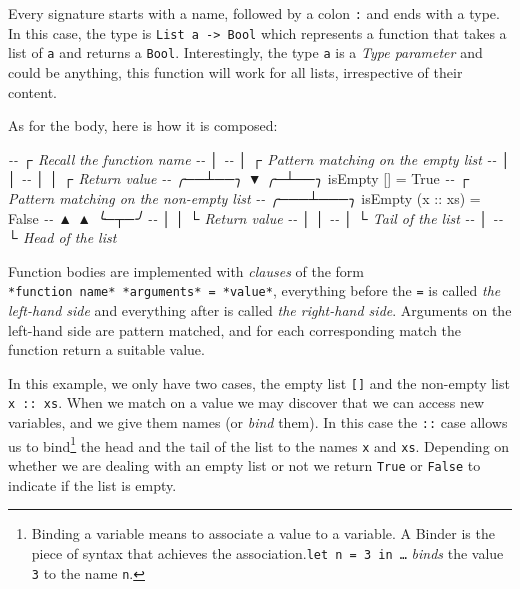 \documentclass[
]{article}
\newenvironment{Shaded}{}{}
\newcommand{\CommentTok}[1]{\textcolor[rgb]{0.38,0.63,0.69}{\textit{#1}}}
\newcommand{\DataTypeTok}[1]{\textcolor[rgb]{0.56,0.13,0.00}{#1}}
\newcommand{\NormalTok}[1]{#1}
\newcommand{\OtherTok}[1]{\textcolor[rgb]{0.00,0.44,0.13}{#1}}
\begin{document}
Every signature starts with a name, followed by a colon \texttt{:} and
ends with a type. In this case, the type is
\texttt{List\ a\ -\textgreater{}\ Bool} which represents a function that
takes a list of \texttt{a} and returns a \texttt{Bool}. Interestingly,
the type \texttt{a} is a \emph{Type parameter} and could be anything,
this function will work for all lists, irrespective of their content.

As for the body, here is how it is composed:

\begin{Shaded}
\begin{Highlighting}[]
\CommentTok{{-}{-}    ┌ Recall the function name}
\CommentTok{{-}{-}    │   }
\CommentTok{{-}{-}    │     ┌ Pattern matching on the empty list}
\CommentTok{{-}{-}    │     │   }
\CommentTok{{-}{-}    │     │    ┌ Return value}
\CommentTok{{-}{-} ╭──┴──╮  ▼  ╭─┴──╮}
\NormalTok{   isEmpty [] }\OtherTok{=} \DataTypeTok{True}
\CommentTok{{-}{-}             ┌ Pattern matching on the non{-}empty list}
\CommentTok{{-}{-}         ╭───┴───╮}
\NormalTok{   isEmpty (}\OtherTok{x ::}\NormalTok{ xs) }\OtherTok{=} \DataTypeTok{False}
\CommentTok{{-}{-}          ▲    ▲     ╰─┬─╯}
\CommentTok{{-}{-}          │    │       └ Return value}
\CommentTok{{-}{-}          │    │}
\CommentTok{{-}{-}          │    └ Tail of the list}
\CommentTok{{-}{-}          │}
\CommentTok{{-}{-}          └ Head of the list}
\end{Highlighting}
\end{Shaded}

Function bodies are implemented with \emph{clauses} of the form
\texttt{*function\ name*\ *arguments*\ =\ *value*}, everything before
the \texttt{=} is called \emph{the left-hand side} and everything after
is called \emph{the right-hand side}. Arguments on the left-hand side
are pattern matched, and for each corresponding match the function
return a suitable value.

In this example, we only have two cases, the empty list \texttt{{[}{]}}
and the non-empty list \texttt{x\ ::\ xs}. When we match on a value we
may discover that we can access new variables, and we give them names
(or \emph{bind} them). In this case the \texttt{::} case allows us to
bind\footnote{Binding a variable means to associate a value to a
  variable. A Binder is the piece of syntax that achieves the
  association.\texttt{let\ n\ =\ 3\ in\ \ldots{}} \emph{binds} the value
  \texttt{3} to the name \texttt{n}.} the head and the tail of the list
to the names \texttt{x} and \texttt{xs}. Depending on whether we are
dealing with an empty list or not we return \texttt{True} or
\texttt{False} to indicate if the list is empty.
\end{document}
